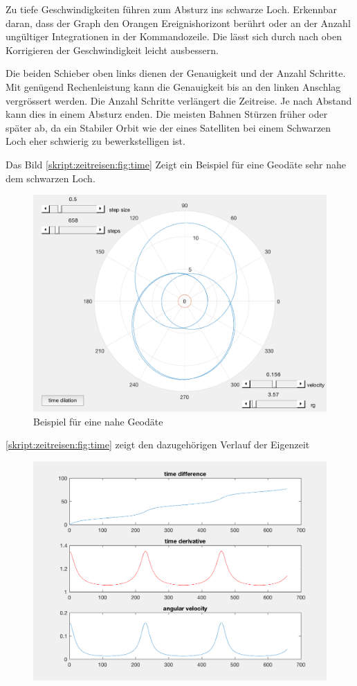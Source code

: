\begin{refsection}
    Zu tiefe Geschwindigkeiten führen zum Absturz ins schwarze Loch. Erkennbar daran, dass der Graph den Orangen Ereignishorizont berührt oder an der Anzahl ungültiger Integrationen in der Kommandozeile. Die lässt sich durch nach oben Korrigieren der Geschwindigkeit leicht ausbessern.
    
    Die beiden Schieber oben links dienen der Genauigkeit und der Anzahl Schritte. Mit genügend Rechenleistung kann die Genauigkeit bis an den linken Anschlag vergrössert werden. Die Anzahl Schritte verlängert die Zeitreise. Je nach Abstand kann dies in einem Absturz enden. Die meisten Bahnen Stürzen früher oder später ab, da ein Stabiler Orbit wie der eines Satelliten bei einem Schwarzen Loch eher schwierig zu bewerkstelligen ist.
    
    Das Bild \ref{skript:zeitreisen:fig:time} Zeigt ein Beispiel für eine Geodäte sehr nahe dem schwarzen Loch.
      \begin{figure}
        \centering
        \includegraphics[width=12cm]{zeitreisen/Bsp.png}
        \caption{Beispiel für eine nahe Geodäte}
        \label{skript:zeitreisen:fig:Bsp} 
    \end{figure}
    \ref{skript:zeitreisen:fig:time} zeigt den dazugehörigen Verlauf der Eigenzeit
      \begin{figure}
        \centering
        \includegraphics[width=12cm]{zeitreisen/Bsp_time.png}

\end{figure}
\end{refsection}
